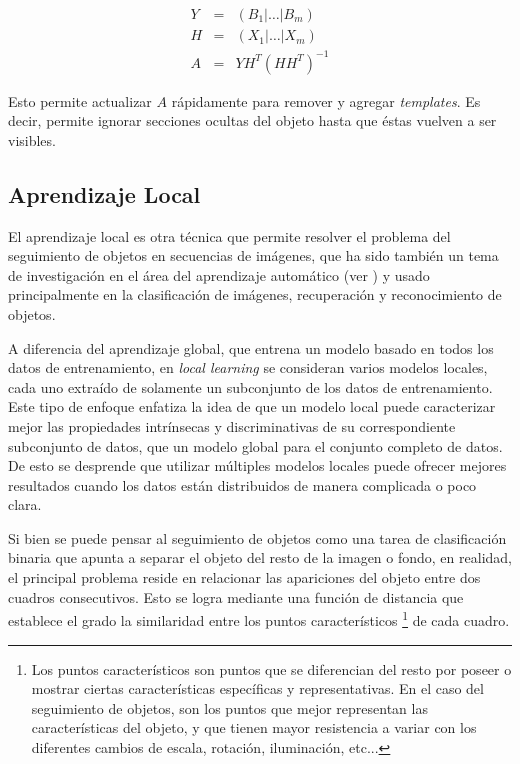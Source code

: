 \documentclass[a4paper,10pt]{article}
\begin{document}
\begin{eqnarray*}
    Y &=& \left( B_1 \lvert \dots \lvert B_m \right) \\
    H &=& \left( X_1 \lvert \dots \lvert X_m \right) \\
    A &=& Y H^T(HH^T)^{-1}
\end{eqnarray*}

Esto permite actualizar $A$
rápidamente para remover y agregar \textit{templates}. Es decir, permite ignorar
secciones ocultas del objeto hasta que éstas vuelven a ser visibles.

\subsection{Aprendizaje Local}

El aprendizaje local es otra técnica que permite resolver el problema del
seguimiento de objetos en secuencias de imágenes, que ha sido también un tema
de investigación en el área del aprendizaje automático (ver
\cite{local-learning-machine-learning}) y usado principalmente en la
clasificación de imágenes, recuperación y reconocimiento de objetos.

A diferencia del aprendizaje global, que entrena un modelo basado en
todos los datos de entrenamiento, en \textit{local learning} se consideran
varios modelos locales, cada uno extraído de solamente un subconjunto de los
datos de entrenamiento. Este tipo de enfoque enfatiza la idea de que un modelo
local puede caracterizar mejor las propiedades intrínsecas y discriminativas de
su correspondiente subconjunto de datos, que un modelo global para el conjunto
completo de datos. De esto se desprende que utilizar múltiples modelos locales
puede ofrecer mejores resultados cuando los datos están distribuidos de manera
complicada o poco clara.

Si bien se puede pensar al seguimiento de objetos como una tarea de clasificación binaria
que apunta a separar el objeto del resto de la imagen o fondo, en realidad, el principal
problema reside en relacionar las apariciones del objeto entre dos cuadros
consecutivos. Esto se logra mediante una función de distancia que
establece el grado la similaridad entre los puntos característicos \footnote{Los puntos
  característicos son puntos que se diferencian del resto por poseer o mostrar
ciertas características específicas y representativas. En el caso del
seguimiento de objetos, son los puntos que mejor representan las
características del objeto, y que tienen mayor resistencia a variar con los
diferentes cambios de escala, rotación, iluminación, etc...} de cada cuadro.
\end{document}
